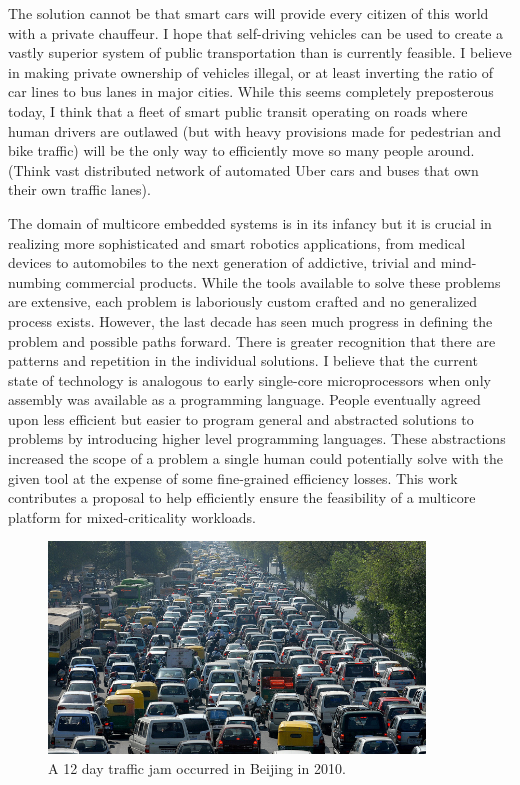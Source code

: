 	The solution cannot be that smart cars will provide every citizen of this world with a private chauffeur. I hope that self-driving vehicles can be used to create a vastly superior system of public transportation than is currently feasible. I believe in making private ownership of vehicles illegal, or at least inverting the ratio of car lines to bus lanes in major cities. While this seems completely preposterous today, I think that a fleet of smart public transit operating on roads where human drivers are outlawed (but with heavy provisions made for pedestrian and bike traffic) will be the only way to efficiently move so many people around. (Think vast distributed network of automated Uber cars and buses that own their own traffic lanes).
	
	The domain of multicore embedded systems is in its infancy but it is crucial in realizing more sophisticated and smart robotics applications, from medical devices to automobiles to the next generation of addictive, trivial and mind-numbing commercial products. While the tools available to solve these problems are extensive, each problem is laboriously custom crafted and no generalized process exists. However, the last decade has seen much progress in defining the problem and possible paths forward. There is greater recognition that there are patterns and repetition in the individual solutions. I believe that the current state of technology is analogous to early single-core microprocessors when only assembly was available as a programming language. People eventually agreed upon less efficient but easier to program general and abstracted solutions to problems by introducing higher level programming languages. These abstractions increased the scope of a problem a single human could potentially solve with the given tool at the expense of some fine-grained efficiency losses. This work contributes a proposal to help efficiently ensure the feasibility of a multicore platform for mixed-criticality workloads.
	
\begin{figure}[h]
\centering
\includegraphics[width=10cm]{Figures/beijingtrafficjam.jpg}
\caption{A 12 day traffic jam occurred in Beijing in 2010.}
\label{f:jam}
\end{figure}
	
